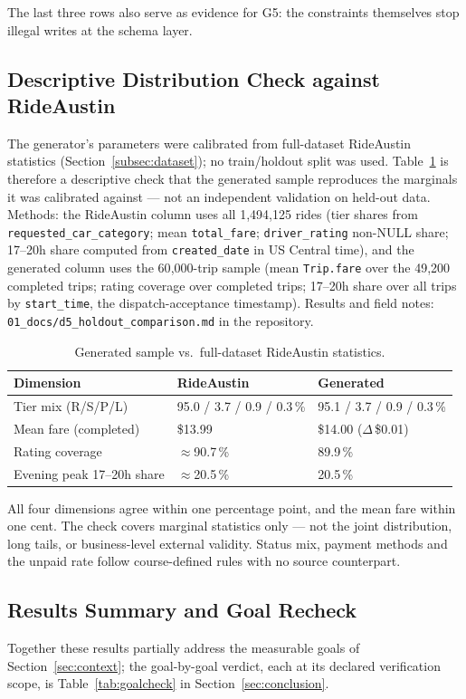 The last three rows also serve as evidence for G5: the constraints themselves stop illegal writes at the schema layer.

\subsection{Descriptive Distribution Check against RideAustin}
The generator's parameters were calibrated from full-dataset RideAustin statistics (Section~\ref{subsec:dataset}); no train/holdout split was used. Table~\ref{tab:holdout} is therefore a descriptive check that the generated sample reproduces the marginals it was calibrated against --- not an independent validation on held-out data. Methods: the RideAustin column uses all 1{,}494{,}125 rides (tier shares from \texttt{requested\_car\_category}; mean \texttt{total\_fare}; \texttt{driver\_rating} non-NULL share; 17--20h share computed from \texttt{created\_date} in US Central time), and the generated column uses the 60{,}000-trip sample (mean \texttt{Trip.fare} over the 49{,}200 completed trips; rating coverage over completed trips; 17--20h share over all trips by \texttt{start\_time}, the dispatch-acceptance timestamp). Results and field notes: \texttt{01\_docs/d5\_holdout\_comparison.md} in the repository.

\begin{table}[h]
\centering
\caption{Generated sample vs.\ full-dataset RideAustin statistics.}
\label{tab:holdout}
\small
\begin{tabular}{@{}lll@{}}
\toprule
Dimension & RideAustin & Generated \\
\midrule
Tier mix (R/S/P/L) & 95.0 / 3.7 / 0.9 / 0.3\,\% & 95.1 / 3.7 / 0.9 / 0.3\,\% \\
Mean fare (completed) & \$13.99 & \$14.00 ($\Delta$\,\$0.01) \\
Rating coverage & $\approx$90.7\,\% & 89.9\,\% \\
Evening peak 17--20h share & $\approx$20.5\,\% & 20.5\,\% \\
\bottomrule
\end{tabular}
\end{table}

All four dimensions agree within one percentage point, and the mean fare within one cent. The check covers marginal statistics only --- not the joint distribution, long tails, or business-level external validity. Status mix, payment methods and the unpaid rate follow course-defined rules with no source counterpart.

\subsection{Results Summary and Goal Recheck}
Together these results partially address the measurable goals of Section~\ref{sec:context}; the goal-by-goal verdict, each at its declared verification scope, is Table~\ref{tab:goalcheck} in Section~\ref{sec:conclusion}.
